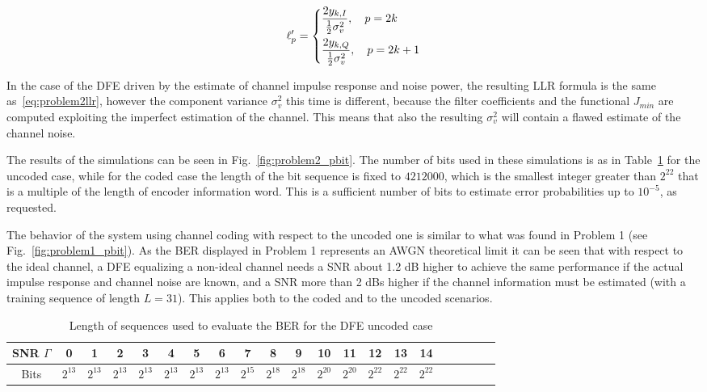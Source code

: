 \documentclass[10pt]{article}
\begin{document}
\begin{equation}
	\ell'_p =
	\begin{dcases}
	\frac{2 y_{k,I}}{\frac{1}{2} \sigma_v^2}, \quad p = 2k \\
	\frac{2 y_{k,Q}}{\frac{1}{2} \sigma_v^2}, \quad p = 2k +1
	\end{dcases}
	\label{eq:problem2llr}
\end{equation}

In the case of the DFE driven by the estimate of channel impulse response and noise power, the resulting LLR formula is the same as~\eqref{eq:problem2llr}, however the component variance $\sigma_v^2$ this time is different, because the filter coefficients and the functional $J_{min}$ are computed exploiting the imperfect estimation of the channel. This means that also the resulting $\sigma_v^2$ will contain a flawed estimate of the channel noise. 

The results of the simulations can be seen in Fig.~\ref{fig:problem2_pbit}. The number of bits used in these simulations is as in Table~\ref{table:BER_len_DFE} for the uncoded case, while for the coded case the length of the bit sequence is fixed to $4212000$, which is the smallest integer greater than $2^{22}$ that is a multiple of the length of encoder information word. This is a sufficient number of bits to estimate error probabilities up to $10^{-5}$, as requested.

The behavior of the system using channel coding with respect to the uncoded one is similar to what was found in Problem 1 (see Fig.~\ref{fig:problem1_pbit}). As the BER displayed in Problem 1 represents an AWGN theoretical limit it can be seen that with respect to the ideal channel, a DFE equalizing a non-ideal channel needs a SNR about 1.2 dB higher to achieve the same performance if the actual impulse response and channel noise are known, and a SNR more than 2 dBs higher if the channel information must be estimated (with a training sequence of length $L=31$). This applies both to the coded and to the uncoded scenarios. %
\begin{table}[h!]
	\begin{tabular}{c|c|c|c|c|c|c|c|c|c|c|c|c|c|c|c|c|c|c|c|c}
		SNR $\Gamma$	& 0 & 1 & 2 & 3 & 4 &	5	&	6	&	7	&	8	&	9	&	10	&	11	&	12	&	13	&	14	\\ \hline	
		Bits	& $2^{13}$ & $2^{13}$ & $2^{13}$ & $2^{13}$ & $2^{13}$ & $2^{13}$ & $2^{13}$ & $2^{15}$ & $2^{18}$ & $2^{18}$ & $2^{20}$ & $2^{20}$ & $2^{22}$ & $2^{22}$ & $2^{22}$ \\
	\end{tabular}
	\caption{Length of sequences used to evaluate the BER for the DFE uncoded case}
	\label{table:BER_len_DFE}
\end{table}
\end{document}
